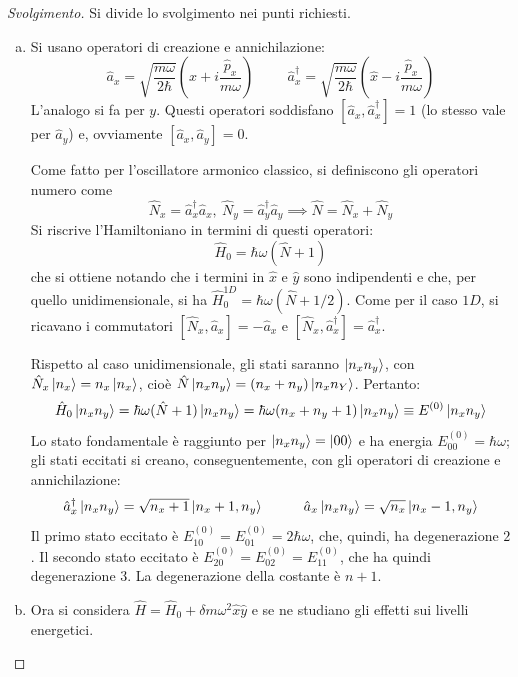 \documentclass[11pt, a4paper]{scrartcl} %
\numberwithin{equation}{subsection}
\theoremstyle{style2}
\theoremstyle{style1}
\renewcommand\qedsymbol{$\blacksquare$}
\newenvironment{svolgimento}{\renewcommand\qedsymbol{$\spadesuit$}\begin{proof}[Svolgimento]}{\end{proof}}
\begin{document}
\begin{svolgimento}Si divide lo svolgimento nei punti richiesti.
	\begin{enumerate}[(a).]
		\item Si usano operatori di creazione e annichilazione:
			\[
			\hat{a}_x = \sqrt{\frac{m\omega}{2\hbar }} \left(\hat{x}+ i \frac{\hat{p}_x}{m\omega}\right) \hspace{1cm} \hat{a}_x^\dagger = \sqrt{\frac{m\omega}{2\hbar }} \left(\hat{x} - i \frac{\hat{p}_x}{m\omega}\right) 
			\] 
			L'analogo si fa per $y$.
			Questi operatori soddisfano $[\hat{a}_x, \hat{a}_x^\dagger ]= 1$ (lo stesso vale per $\hat{a}_y$) e, ovviamente $[\hat{a}_x,\hat{a}_y] = 0$.

			Come fatto per l'oscillatore armonico classico, si definiscono gli operatori numero come
			\[
			\hat{N}_x = \hat{a}^\dagger _x \hat{a}_x , \ \hat{N}_y= \hat{a}_y^\dagger \hat{a}_y \implies \hat{N} = \hat{N}_x + \hat{N}_y
			\] 
			Si riscrive l'Hamiltoniano in termini di questi operatori:
			\[
			\hat{H}_0 = \hbar  \omega (\hat{N} + 1) 
			\] 
			che si ottiene notando che i termini in $\hat{x}$ e $\hat{y}$ sono indipendenti e che, per quello unidimensionale, si ha $\hat{H}_0^{1D} = \hbar \omega(\hat{N} + 1 / 2)$.
			Come per il caso $1D$, si ricavano i commutatori $[\hat{N}_x, \hat{a}_x] = - \hat{a}_x$ e $[\hat{N}_x, \hat{a}_x^\dagger ] = \hat{a}_x ^\dagger $.

			Rispetto al caso unidimensionale, gli stati saranno $\ket{n_xn_y} $, con $\hat{N}_x \ket{n_x} = n_x \ket{n_x} $, cio\`e $\hat{N} \ket{n_xn_y} = (n_x+n_y) \ket{n_xn_Y} $.
			Pertanto:
			\[
			\hat{H}_0 \ket{n_xn_y} = \hbar \omega (\hat{N} + 1 ) \ket{n_xn_y} = \hbar \omega (n_x + n_y+1)\ket{n_xn_y} \equiv E^{(0)} \ket{n_xn_y} 
			\] 
			Lo stato fondamentale \`e raggiunto per $\ket{n_xn_y} = \ket{00} $ e ha energia $E^{(0)} _{00} = \hbar \omega$; gli stati eccitati si creano, conseguentemente, con gli operatori di creazione e annichilazione:
			\[
			\hat{a}_x^\dagger \ket{n_xn_y} = \sqrt{n_x + 1} \ket{n_x + 1, n_y}  \hspace{1cm}\hat{a}_x \ket{n_xn_y}   = \sqrt{n_x} \ket{n_x - 1, n_y} 
			\] 
			Il primo stato eccitato \`e $E^{(0)} _{10} =E^{(0)} _{01} =2\hbar \omega$, che, quindi, ha degenerazione $2$.
			Il secondo stato eccitato \`e $E_{20} ^{(0)} = E_{02} ^{(0)} = E_{11}^{(0)} $, che ha quindi degenerazione $3$.
La degenerazione della costante \`e $n+1$.
\item Ora si considera $\hat{H} = \hat{H}_0 + \delta m\omega^2 \hat{x}\hat{y}$ e se ne studiano gli effetti sui livelli energetici.


\end{enumerate}
\end{svolgimento}
\end{document}
